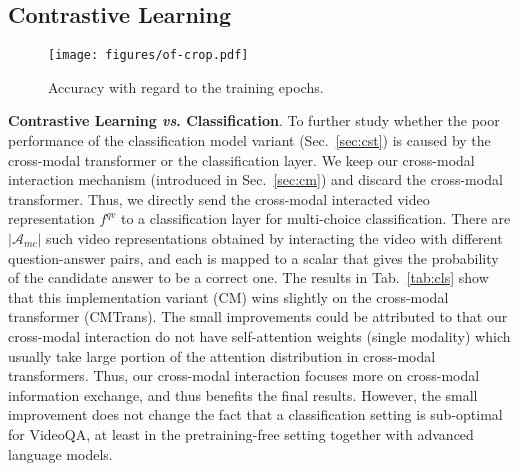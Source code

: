 \documentclass[10pt,journal,compsoc]{IEEEtran}
\newcommand{\vs}{\textit{vs}. }
\begin{document}
\subsection{Contrastive Learning}
\label{app:cst}
\begin{figure*}[t!]
  \begin{center}
    \texttt{[image: figures/of-crop.pdf]}
  \end{center}
   \vspace{-0.5em}
  \caption{Accuracy with regard to the training epochs.}
  \vspace{-0.4cm}
  \label{fig:of}
\end{figure*}
\textbf{Contrastive Learning \vs Classification}. 
To further study whether the poor performance of the classification model variant (Sec.~\ref{sec:cst}) is caused by the cross-modal transformer or the classification layer. We keep our cross-modal interaction mechanism (introduced in Sec.~\ref{sec:cm}) and discard the cross-modal transformer. Thus, we directly send the cross-modal interacted video representation $f^{qv}$ to a classification layer for multi-choice classification.
There are $|\mathcal{A}_{mc}|$ such video representations obtained by interacting the video with different question-answer pairs, and each is mapped to a scalar that gives the probability of the candidate answer to be a correct one. The results in Tab.~\ref{tab:cls} show that this implementation variant (CM) wins slightly on the cross-modal transformer (CMTrans). The small improvements could be attributed to that our cross-modal interaction do not have self-attention weights (single modality) which usually take large portion of the attention distribution in cross-modal transformers. Thus, our cross-modal interaction focuses more on cross-modal information exchange, and thus benefits the final results. However, the small improvement does not change the fact that a classification setting is sub-optimal for VideoQA, at least in the pretraining-free setting together with advanced language models.
\setlength{\tabcolsep}{4pt}
\begin{table}[t!]
    \small
    \centering
    \caption{A detailed study of the classification model variants.
    }
    \label{tab:cls}
    \vspace{-0.5em}
\end{table}
\end{document}
